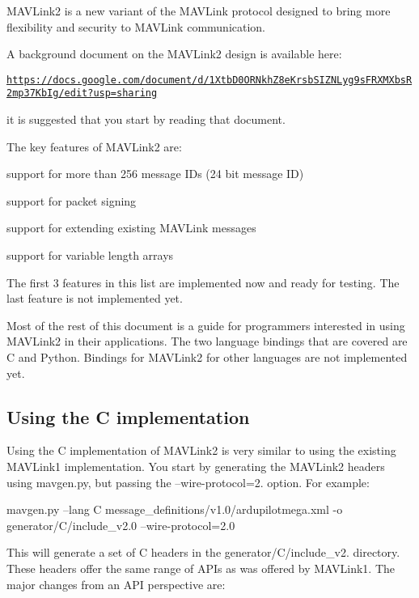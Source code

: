 M\+A\+V\+Link2 is a new variant of the M\+A\+V\+Link protocol designed to bring more flexibility and security to M\+A\+V\+Link communication.

A background document on the M\+A\+V\+Link2 design is available here\+:

\href{https://docs.google.com/document/d/1XtbD0ORNkhZ8eKrsbSIZNLyg9sFRXMXbsR2mp37KbIg/edit?usp=sharing}{\tt https\+://docs.\+google.\+com/document/d/1\+Xtb\+D0\+O\+R\+Nkh\+Z8e\+Krsb\+S\+I\+Z\+N\+Lyg9s\+F\+R\+X\+M\+Xbs\+R2mp37\+Kb\+Ig/edit?usp=sharing}

it is suggested that you start by reading that document.

The key features of M\+A\+V\+Link2 are\+:


\begin{DoxyItemize}
\item support for more than 256 message I\+Ds (24 bit message ID)
\item support for packet signing
\item support for extending existing M\+A\+V\+Link messages
\item support for variable length arrays
\end{DoxyItemize}

The first 3 features in this list are implemented now and ready for testing. The last feature is not implemented yet.

Most of the rest of this document is a guide for programmers interested in using M\+A\+V\+Link2 in their applications. The two language bindings that are covered are C and Python. Bindings for M\+A\+V\+Link2 for other languages are not implemented yet.

\subsection*{Using the C implementation}

Using the C implementation of M\+A\+V\+Link2 is very similar to using the existing M\+A\+V\+Link1 implementation. You start by generating the M\+A\+V\+Link2 headers using mavgen.\+py, but passing the --wire-\/protocol=2. option. For example\+:


\begin{DoxyCode}
mavgen.py --lang C message\_definitions/v1.0/ardupilotmega.xml -o generator/C/include\_v2.0
       --wire-protocol=2.0
\end{DoxyCode}


This will generate a set of C headers in the generator/\+C/include\+\_\+v2. directory. These headers offer the same range of A\+P\+Is as was offered by M\+A\+V\+Link1. The major changes from an A\+PI perspective are\+:


